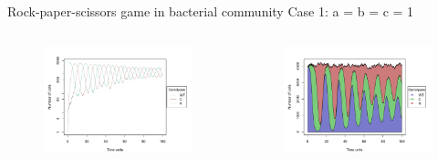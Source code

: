\begin{frame}{Rock-paper-scissors game in bacterial community}
Case 1: a = b = c = 1
	\begin{columns}
		\begin{column}{0.5\textwidth}
			\begin{figure}
				\includegraphics[scale=0.35]{img/CRS_caso1_1.png}			
			\end{figure}
		\end{column}

		\begin{column}{0.5\textwidth}
			\begin{figure}
				\includegraphics[scale=0.35]{img/CRS_caso1_2.png}			
			\end{figure}
		\end{column}
	\end{columns}
\end{frame}

